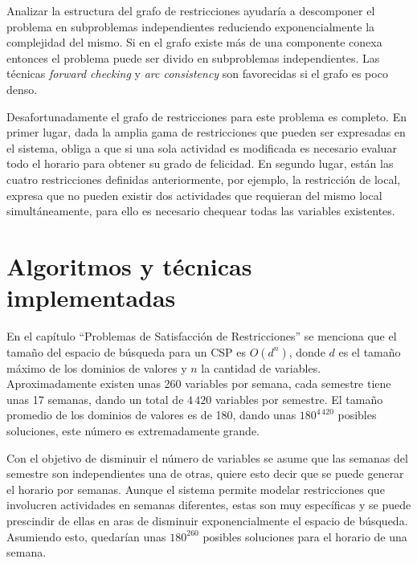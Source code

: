 Analizar la estructura del grafo de restricciones ayudar\'ia a descomponer el problema en subproblemas independientes reduciendo exponencialmente la complejidad del mismo. Si en el grafo existe m\'as de una componente conexa entonces el problema puede ser divido en subproblemas independientes. Las t\'ecnicas \emph{forward checking} y \emph{arc consistency} son favorecidas si el grafo es poco denso.

Desafortunadamente el grafo de restricciones para este problema es completo. En primer lugar, dada la amplia gama de restricciones que pueden ser expresadas en el sistema, obliga a que si una sola actividad es modificada es necesario evaluar todo el horario para obtener su grado de felicidad. En segundo lugar, est\'an las cuatro restricciones definidas anteriormente, por ejemplo, la restricci\'on de local, expresa que no pueden existir dos actividades que requieran del mismo local simult\'aneamente, para ello es necesario chequear todas las variables existentes. 

\section{Algoritmos y t\'ecnicas implementadas}

En el cap\'itulo ``Problemas de Satisfacci\'on de Restricciones'' se menciona que el tamaño del espacio de b\'usqueda para un CSP es $O(d^{n})$, donde $d$ es el tamaño m\'aximo de los dominios de valores y $n$ la cantidad de variables. Aproximadamente existen unas 260 variables por semana, cada semestre tiene unas 17 semanas, dando un total de $4\,420$ variables por semestre. El tamaño promedio de los dominios de valores es de 180, dando unas $180^{4\,420}$ posibles soluciones, este n\'umero es extremadamente grande.

Con el objetivo de disminuir el n\'umero de variables se asume que las semanas del semestre son independientes una de otras, quiere esto decir que se puede generar el horario por semanas. Aunque el sistema permite modelar restricciones que involucren actividades en semanas diferentes, estas son muy espec\'ificas y se puede prescindir de ellas en aras de disminuir exponencialmente el espacio de b\'usqueda. Asumiendo esto, quedar\'ian unas $180^{260}$ posibles soluciones para el horario de una semana.

